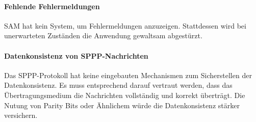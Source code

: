 \paragraph{Fehlende Fehlermeldungen}
\ac{SAM} hat kein System, um Fehlermeldungen anzuzeigen.
Stattdessen wird bei unerwarteten Zuständen die Anwendung gewaltsam abgestürzt.

\paragraph{Datenkonsistenz von \ac{SPPP}-Nachrichten}
Das \ac{SPPP}-Protokoll hat keine eingebauten Mechanismen zum Sicherstellen der Datenkonsistenz.
Es muss entsprechend darauf vertraut werden, dass das Übertragungsmedium die Nachrichten vollständig und korrekt überträgt.
Die Nutung von Parity Bits oder Ähnlichem würde die Datenkonsistenz stärker versichern.


